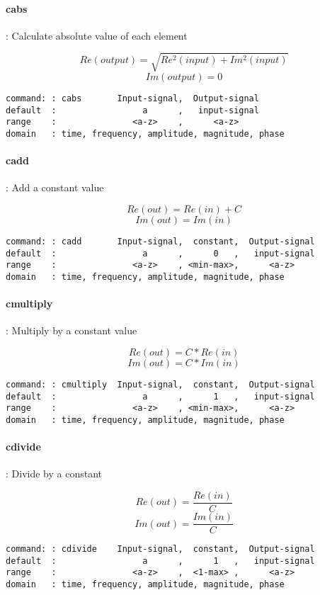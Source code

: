 \documentclass{report}
\newcommand{\bc}{\scriptsize}
\newcommand{\ec}{\normalsize}
\begin{document}
\paragraph{cabs}: Calculate absolute value of each element

\[ Re(output) = \sqrt{Re^{2}(input) + Im^{2}(input)} \]
\[ Im(output) = 0 \]

\bc
\begin{verbatim}
command: : cabs       Input-signal,  Output-signal
default  :                 a      ,   input-signal  
range    :               <a-z>    ,      <a-z>
domain   : time, frequency, amplitude, magnitude, phase
\end{verbatim}
\ec

\paragraph{cadd}: Add a constant value

\[ Re(out) = Re(in) + C \]
\[ Im(out) = Im(in) \]

\bc
\begin{verbatim}
command: : cadd       Input-signal,  constant,  Output-signal
default  :                 a      ,      0   ,   input-signal  
range    :               <a-z>    , <min-max>,      <a-z>
domain   : time, frequency, amplitude, magnitude, phase
\end{verbatim}
\ec


\paragraph{cmultiply}: Multiply by a constant value

\[ Re(out) = C*Re(in) \]
\[ Im(out) = C*Im(in) \]

\bc
\begin{verbatim}
command: : cmultiply  Input-signal,  constant,  Output-signal
default  :                 a      ,      1   ,   input-signal  
range    :               <a-z>    , <min-max>,      <a-z>
domain   : time, frequency, amplitude, magnitude, phase
\end{verbatim}
\ec

\paragraph{cdivide}: Divide by a constant

\[ Re(out) = \frac{Re(in)}{C} \]
\[ Im(out) = \frac{Im(in)}{C} \]

\bc
\begin{verbatim}
command: : cdivide    Input-signal,  constant,  Output-signal
default  :                 a      ,      1   ,   input-signal  
range    :               <a-z>    ,  <1-max> ,      <a-z>
domain   : time, frequency, amplitude, magnitude, phase
\end{verbatim}
\ec
\end{document}
